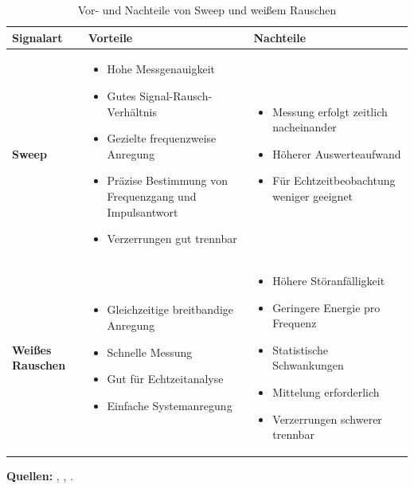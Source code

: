 \begin{table}[h]
\centering
\caption{Vor- und Nachteile von Sweep und weißem Rauschen}
\label{tab:sweep_weissrauschen}
\footnotesize
\setlength{\tabcolsep}{3pt}
\begin{tabularx}{\textwidth}{|X|X|X|}
\hline
\textbf{Signalart} & \textbf{Vorteile} & \textbf{Nachteile} \\
\hline
\textbf{Sweep} &
\vspace{-2mm}
\begin{itemize}[leftmargin=*, nosep, topsep=0pt, parsep=0pt]
    \item Hohe Messgenauigkeit
    \item Gutes Signal-Rausch-Verhältnis
    \item Gezielte frequenzweise Anregung
    \item Präzise Bestimmung von Frequenzgang und Impulsantwort
    \item Verzerrungen gut trennbar
\end{itemize}
\vspace{-2mm}
&
\vspace{-2mm}
\begin{itemize}[leftmargin=*, nosep, topsep=0pt, parsep=0pt]
    \item Messung erfolgt zeitlich nacheinander
    \item Höherer Auswerteaufwand
    \item Für Echtzeitbeobachtung weniger geeignet
\end{itemize}
\vspace{-2mm}
\\
\hline
\textbf{Weißes Rauschen} &
\vspace{-2mm}
\begin{itemize}[leftmargin=*, nosep, topsep=0pt, parsep=0pt]
    \item Gleichzeitige breitbandige Anregung
    \item Schnelle Messung
    \item Gut für Echtzeitanalyse
    \item Einfache Systemanregung
\end{itemize}
\vspace{-2mm}
&
\vspace{-2mm}
\begin{itemize}[leftmargin=*, nosep, topsep=0pt, parsep=0pt]
    \item Höhere Störanfälligkeit
    \item Geringere Energie pro Frequenz
    \item Statistische Schwankungen
    \item Mittelung erforderlich
    \item Verzerrungen schwerer trennbar
\end{itemize}
\vspace{-2mm}
\\
\hline
\end{tabularx}

\vspace{0.2cm}
\scriptsize
\textbf{Quellen:} \cite{Moeser2010}, \cite{Mueller2001}, \cite{Weinzierl2025}.
\end{table}

